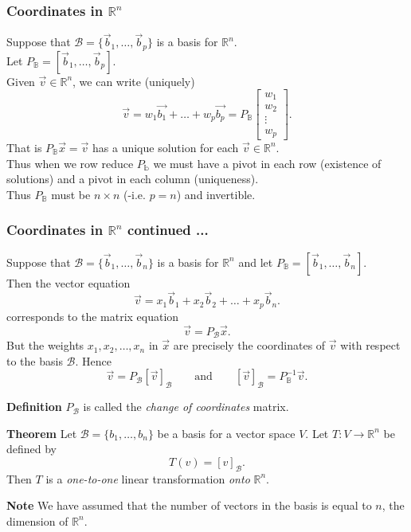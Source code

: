 \begin{frame}[fragile]\frametitle{Coordinates in $\mathbb R^n$}
Suppose that ${\mathcal B} = \{ \vec{b}_1, \dots, \vec{b}_p \}$ is a basis for $\mathbb R^n$.  \\
Let $P_{\mathbb B}=[ \vec{b}_1, \dots, \vec{b}_p]$.   \\
Given $\vec{v}\in \mathbb R^n$, we can write (uniquely) 
$$
\vec{v} = w_1\vec{b_1} + \dots + w_p\vec{b_p}= P_{\mathbb B} \left[\begin{array}{c} w_1\\ w_2\\ \vdots\\ w_p\end{array}\right].
$$
That is $P_{\mathbb B}\vec{x} =\vec{v}$ has a unique solution for each $\vec{v}\in \mathbb R^n$.  \\
Thus when we row reduce $P_{\mathbb b}$ we must have a pivot in each row (existence of solutions) and a pivot in each column (uniqueness). \\
Thus $P_{\mathbb B}$ must be $n\times n$ (-i.e. $p=n$) and invertible.
\end{frame}







 \begin{frame}[fragile]\frametitle{Coordinates in $\mathbb R^n$ continued ... }
Suppose that ${\mathcal B} = \{ \vec{b}_1, \dots, \vec{b}_n \}$ is a basis for $\mathbb R^n$ and 
let $P_{\mathbb B}=[ \vec{b}_1, \dots, \vec{b}_n]$.     \\ 
Then the vector equation 
\[
\vec{v} =  x_1 \vec{b}_1 + x_2 \vec{b}_2 +\dots + x_p\vec{b}_n.
\]
corresponds to the matrix equation
\[
\vec{v} = P_{\mathcal B} \vec{x}.
\] 
But the weights $x_1, x_2, \dots, x_n$ in $\vec{x}$ are precisely the coordinates of 
$\vec{v}$ with respect to the basis $\mathcal B$.  Hence
\[
\vec{v} = P_{\mathcal B} [\vec{v}]_{\mathcal B} \qquad \mbox{and} \qquad [\vec{v}]_{\mathcal B} = P_{\mathbb B}^{-1}\vec{v}.
\] 


\textbf{Definition}
$P_{\mathcal B}$ is called the {\em change of coordinates} matrix.


\end{frame}










 \begin{frame}[fragile]
\textbf{Theorem}
Let ${\mathcal B}=\{{b}_1, \dots,{b}_n \}$ 
be a basis for a vector space $V$.  Let $T:V\rightarrow \mathbb R^n$ be defined by 
\[
T({v}) = [{v}]_{\mathcal B}.
\]
Then $T$ is a {\em one-to-one} linear transformation {\em onto} $\mathbb R^n$.



\textbf{Note}
We have assumed that the number of vectors in the basis is equal to $n$, 
the dimension of $\mathbb R^n$.

\end{frame}






